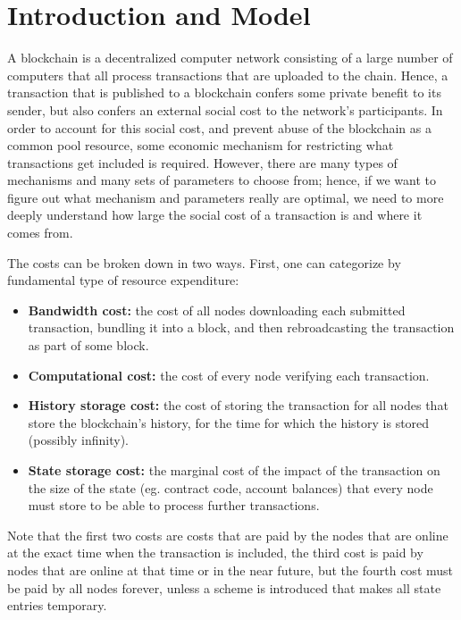 \documentclass[12pt, final]{article}
\begin{document}
\section{Introduction and Model}

A blockchain is a decentralized computer network consisting of a large number of computers that all process transactions that are uploaded to the chain. Hence, a transaction that is published to a blockchain confers some private benefit to its sender, but also confers an external social cost to the network's participants. In order to account for this social cost, and prevent abuse of the blockchain as a common pool resource, some economic mechanism for restricting what transactions get included is required. However, there are many types of mechanisms and many sets of parameters to choose from; hence, if we want to figure out what mechanism and parameters really are optimal, we need to more deeply understand how large the social cost of a transaction is and where it comes from.

The costs can be broken down in two ways. First, one can categorize by fundamental type of resource expenditure:

\begin{itemize}
\item[] \textbf{Bandwidth cost:} the cost of all nodes downloading each submitted transaction, bundling it into a block, and then rebroadcasting the transaction as part of some block.

\item[] \textbf{Computational cost:} the cost of every node verifying each transaction.

\item[] \textbf{History storage cost:} the cost of storing the transaction for all nodes that store the blockchain's history, for the time for which the history is stored (possibly infinity).

\item[] \textbf{State storage cost:} the marginal cost of the impact of the transaction on the size of the state (eg. contract code, account balances) that every node must store to be able to process further transactions.
\end{itemize}

Note that the first two costs are costs that are paid by the nodes that are online at the exact time when the transaction is included, the third cost is paid by nodes that are online at that time or in the near future, but the fourth cost must be paid by all nodes forever, unless a scheme is introduced that makes all state entries temporary.
\end{document}
